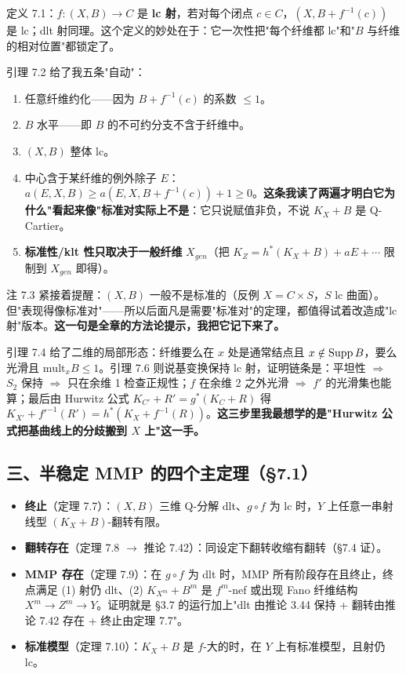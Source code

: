 定义 7.1：$f:(X,B)\to C$ 是 \textbf{lc 射}，若对每个闭点 $c\in C$，$(X,B+f^{-1}(c))$ 是 lc；dlt 射同理。这个定义的妙处在于：它一次性把"每个纤维都 lc"和"$B$ 与纤维的相对位置"都锁定了。

引理 7.2 给了我五条"自动"：

\begin{enumerate}
\item 任意纤维约化——因为 $B+f^{-1}(c)$ 的系数 $\le1$。
\item $B$ 水平——即 $B$ 的不可约分支不含于纤维中。
\item $(X,B)$ 整体 lc。
\item 中心含于某纤维的例外除子 $E$：$a(E,X,B)\ge a(E,X,B+f^{-1}(c))+1\ge0$。\textbf{这条我读了两遍才明白它为什么"看起来像"标准对实际上不是}：它只说赋值非负，不说 $K_X+B$ 是 Q-Cartier。
\item \textbf{标准性/klt 性只取决于一般纤维} $X_{gen}$（把 $K_Z=h^*(K_X+B)+aE+\cdots$ 限制到 $X_{gen}$ 即得）。
\end{enumerate}

注 7.3 紧接着提醒：$(X,B)$ 一般不是标准的（反例 $X=C\times S$，$S$ lc 曲面）。但"表现得像标准对"——所以后面凡是需要"标准对"的定理，都值得试着改造成"lc 射"版本。\textbf{这一句是全章的方法论提示，我把它记下来了。}

引理 7.4 给了二维的局部形态：纤维要么在 $x$ 处是通常结点且 $x\notin\operatorname{Supp} B$，要么光滑且 $\mathrm{mult}_xB\le1$。引理 7.6 则说基变换保持 lc 射，证明链条是：平坦性 $\Rightarrow$ $S_2$ 保持 $\Rightarrow$ 只在余维 1 检查正规性；$f$ 在余维 2 之外光滑 $\Rightarrow$ $f'$ 的光滑集也能算；最后由 Hurwitz 公式 $K_{C'}+R'=g^*(K_C+R)$ 得 $K_{X'}+f'^{-1}(R')=h^*(K_X+f^{-1}(R))$。\textbf{这三步里我最想学的是"Hurwitz 公式把基曲线上的分歧搬到 $X$ 上"这一手。}

\subsection*{三、半稳定 MMP 的四个主定理（\S7.1）}

\begin{itemize}
\item \textbf{终止}（定理 7.7）：$(X,B)$ 三维 Q-分解 dlt、$g\circ f$ 为 lc 时，$Y$ 上任意一串射线型 $(K_X+B)$-翻转有限。
\item \textbf{翻转存在}（定理 7.8 $\to$ 推论 7.42）：同设定下翻转收缩有翻转（\S7.4 证）。
\item \textbf{MMP 存在}（定理 7.9）：在 $g\circ f$ 为 dlt 时，MMP 所有阶段存在且终止，终点满足 (1) 射仍 dlt、(2) $K_{X^m}+B^m$ 是 $f^m$-nef 或出现 Fano 纤维结构 $X^m\to Z^m\to Y$。证明就是 \S3.7 的运行加上"dlt 由推论 3.44 保持 + 翻转由推论 7.42 存在 + 终止由定理 7.7"。
\item \textbf{标准模型}（定理 7.10）：$K_X+B$ 是 $f$-大的时，在 $Y$ 上有标准模型，且射仍 lc。
\end{itemize}

